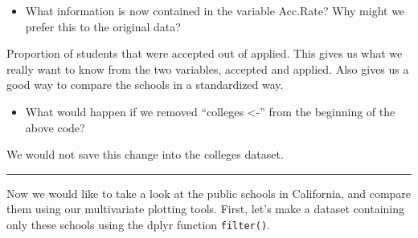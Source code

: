 \documentclass[]{article}
\newenvironment{Shaded}{\begin{snugshade}}{\end{snugshade}}
\newcommand{\CommentTok}[1]{\textcolor[rgb]{0.56,0.35,0.01}{\textit{#1}}}
\newcommand{\DataTypeTok}[1]{\textcolor[rgb]{0.13,0.29,0.53}{#1}}
\newcommand{\KeywordTok}[1]{\textcolor[rgb]{0.13,0.29,0.53}{\textbf{#1}}}
\newcommand{\NormalTok}[1]{#1}
\newcommand{\OperatorTok}[1]{\textcolor[rgb]{0.81,0.36,0.00}{\textbf{#1}}}
\newcommand{\StringTok}[1]{\textcolor[rgb]{0.31,0.60,0.02}{#1}}
\providecommand{\tightlist}{%
  \setlength{\itemsep}{0pt}\setlength{\parskip}{0pt}}
\begin{document}
\begin{Shaded}
\end{Shaded}

\begin{itemize}
\tightlist
\item
  What information is now contained in the variable Acc.Rate? Why might
  we prefer this to the original data?
\end{itemize}

Proportion of students that were accepted out of applied. This gives us
what we really want to know from the two variables, accepted and
applied. Also gives us a good way to compare the schools in a
standardized way.

\begin{itemize}
\tightlist
\item
  What would happen if we removed ``colleges \textless{}-'' from the
  beginning of the above code?
\end{itemize}

We would not save this change into the colleges dataset.

\begin{center}\rule{0.5\linewidth}{\linethickness}\end{center}

Now we would like to take a look at the public schools in California,
and compare them using our multivariate plotting tools. First, let's
make a dataset containing only these schools using the dplyr function
\texttt{filter()}.

\begin{Shaded}
\end{Shaded}
\end{document}
